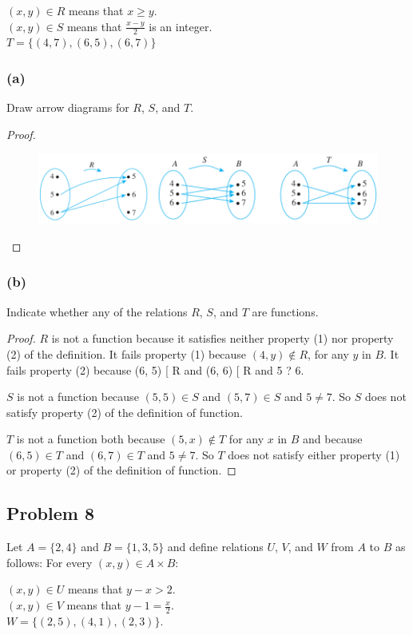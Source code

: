 \documentclass[14pt]{extarticle}
\begin{document}
\begin{center}
$(x, y) \in R$ means that $x \geq y$. \\
$(x, y) \in S$ means that $\frac{x-y}{2}$ is an integer. \\
$T = \{(4, 7), (6, 5), (6, 7)\}$
\end{center}

\subsubsection{(a)}
Draw arrow diagrams for $R$, $S$, and $T$.

\begin{proof}
\begin{figure}[ht!]
\centering
\includegraphics[scale=0.5]{../images/1.3.7.png}
\end{figure}
\end{proof}

\subsubsection{(b)}
Indicate whether any of the relations $R$, $S$, and $T$ are functions.

\begin{proof}
$R$ is not a function because it satisfies neither property (1) nor property (2)
of the definition. It fails property (1) because $(4, y) \notin R$, for any $y$
in $B$. It fails property (2) because (6, 5) [ R and (6, 6) [ R and 5 ? 6.

$S$ is not a function because $(5, 5) \in S$ and $(5, 7) \in S$ and
$5 \neq 7$. So $S$ does not satisfy property (2) of the definition of function.

$T$ is not a function both because $(5, x) \notin T$ for any $x$ in $B$ and
because $(6, 5) \in T$ and $(6, 7) \in T$ and $5 \neq 7$. So $T$ does not
satisfy either property (1) or property (2) of the definition of function.
\end{proof}

\subsection{Problem 8}
Let $A = \{2, 4\}$ and $B = \{1, 3, 5\}$ and define relations $U$, $V$, and
$W$ from $A$ to $B$ as follows: For every $(x, y) \in A \times B$:
\begin{center}
$(x, y) \in U$ means that $y - x > 2$.\\
$(x, y) \in V$ means that $y - 1 = \frac{x}{2}$.\\
$W = \{(2, 5), (4, 1), (2, 3)\}$.
\end{center}
\end{document}
